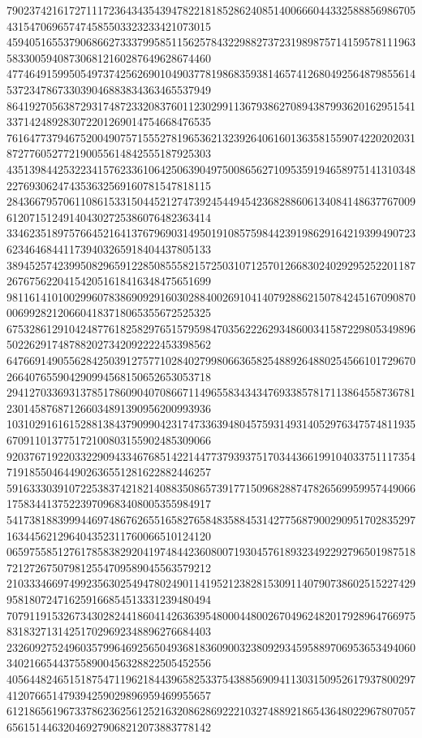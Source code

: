 \begin{DoxyCode}
      790237421617271117236434354394782218185286240851400666044332588856986705431547069657474585503323233421073015
      459405165537906866273337995851156257843229882737231989875714159578111963583300594087306812160287649628674460
      477464915995054973742562690104903778198683593814657412680492564879855614537234786733039046883834363465537949
      864192705638729317487233208376011230299113679386270894387993620162951541337142489283072201269014754668476535
      761647737946752004907571555278196536213239264061601363581559074220202031872776052772190055614842555187925303
      435139844253223415762336106425063904975008656271095359194658975141310348227693062474353632569160781547818115
      284366795706110861533150445212747392454494542368288606134084148637767009612071512491404302725386076482363414
      334623518975766452164137679690314950191085759844239198629164219399490723623464684411739403265918404437805133
      389452574239950829659122850855582157250310712570126683024029295252201187267675622041542051618416348475651699
      981161410100299607838690929160302884002691041407928862150784245167090870006992821206604183718065355672525325
      675328612910424877618258297651579598470356222629348600341587229805349896502262917487882027342092222453398562
      647669149055628425039127577102840279980663658254889264880254566101729670266407655904290994568150652653053718
      294127033693137851786090407086671149655834343476933857817113864558736781230145876871266034891390956200993936
      103102916161528813843790990423174733639480457593149314052976347574811935670911013775172100803155902485309066
      920376719220332290943346768514221447737939375170344366199104033751117354719185504644902636551281622882446257
      591633303910722538374218214088350865739177150968288747826569959957449066175834413752239709683408005355984917
      541738188399944697486762655165827658483588453142775687900290951702835297163445621296404352311760066510124120
      065975585127617858382920419748442360800719304576189323492292796501987518721272675079812554709589045563579212
      210333466974992356302549478024901141952123828153091140790738602515227429958180724716259166854513331239480494
      707911915326734302824418604142636395480004480026704962482017928964766975831832713142517029692348896276684403
      232609275249603579964692565049368183609003238092934595889706953653494060340216654437558900456328822505452556
      405644824651518754711962184439658253375438856909411303150952617937800297412076651479394259029896959469955657
      612186561967337862362561252163208628692221032748892186543648022967807057656151446320469279068212073883778142

\end{DoxyCode}
